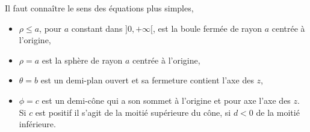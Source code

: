 \begin{example}
Il faut connaître le sens des équations plus simples, 
\begin{itemize}
\item $\rho\leq a$, pour $a$ constant dans  $]0, +\infty[$, est la boule fermée de rayon $a$ centrée à l'origine, 
\item $\rho= a$ est  la sphère de rayon $a$ centrée à l'origine,
\item $\theta = b$ est un demi-plan ouvert et sa fermeture contient l'axe des $z$,
\item $\phi= c$ est un demi-cône qui a  son sommet à l'origine et  pour axe l'axe des $z$.  Si $c$ est positif  il s'agit  de la moitié supérieure du cône, si $d<0$ de la moitié inférieure. 
\end{itemize}
 \end{example}
